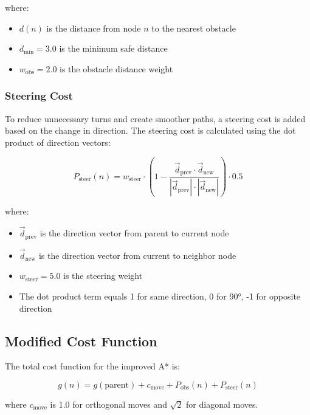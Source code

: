 \documentclass[aps,letterpaper,10pt]{revtex4}
\begin{document}
where:
\begin{itemize}
    \item $d(n)$ is the distance from node $n$ to the nearest obstacle
    \item $d_{\text{min}} = 3.0$ is the minimum safe distance
    \item $w_{\text{obs}} = 2.0$ is the obstacle distance weight
\end{itemize}

\subsubsection{Steering Cost}

To reduce unnecessary turns and create smoother paths, a steering cost is added based on the change in direction. The steering cost is calculated using the dot product of direction vectors:

\begin{equation}
P_{\text{steer}}(n) = w_{\text{steer}} \cdot \left(1 - \frac{\vec{d}_{\text{prev}} \cdot \vec{d}_{\text{new}}}{|\vec{d}_{\text{prev}}| \cdot |\vec{d}_{\text{new}}|}\right) \cdot 0.5
\end{equation}

where:
\begin{itemize}
    \item $\vec{d}_{\text{prev}}$ is the direction vector from parent to current node
    \item $\vec{d}_{\text{new}}$ is the direction vector from current to neighbor node
    \item $w_{\text{steer}} = 5.0$ is the steering weight
    \item The dot product term equals 1 for same direction, 0 for 90°, -1 for opposite direction
\end{itemize}

\subsection{Modified Cost Function}

The total cost function for the improved A* is:

\begin{equation}
g(n) = g(\text{parent}) + c_{\text{move}} + P_{\text{obs}}(n) + P_{\text{steer}}(n)
\end{equation}

where $c_{\text{move}}$ is 1.0 for orthogonal moves and $\sqrt{2}$ for diagonal moves.
\end{document}
